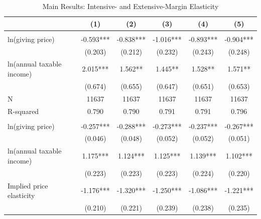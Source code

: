 \documentclass[
  11pt,
  a4paper,
]{article}
\begin{document}
  \begin{table}

  \caption{\label{tab:kableEstimateElasticityPart2}Main Results: Intensive- and Extensive-Margin Elasticity}
  \centering
  \fontsize{7}{9}\selectfont
  \begin{threeparttable}
  \begin{tabular}[t]{lccccc}
  \toprule
   & (1) & (2) & (3) & (4) & (5)\\
  \midrule
  \addlinespace[0.3em]
  \multicolumn{6}{l}{\textbf{Intensive-Margin Elasticity}}\\
  \hspace{1em}ln(giving price) & -0.593*** & -0.838*** & -1.016*** & -0.893*** & -0.904***\\
  \hspace{1em} & (0.203) & (0.212) & (0.232) & (0.243) & (0.248)\\
  \hspace{1em}ln(annual taxable income) & 2.015*** & 1.562** & 1.445** & 1.528** & 1.571**\\
  \hspace{1em} & (0.674) & (0.655) & (0.647) & (0.651) & (0.653)\\
  \hspace{1em}N & 11637 & 11637 & 11637 & 11637 & 11637\\
  \hspace{1em}R-squared & 0.790 & 0.790 & 0.791 & 0.791 & 0.796\\
  \addlinespace[0.3em]
  \multicolumn{6}{l}{\textbf{Extensive-Margin Elasticity}}\\
  \hspace{1em}ln(giving price) & -0.257*** & -0.288*** & -0.273*** & -0.237*** & -0.267***\\
  \hspace{1em} & (0.046) & (0.048) & (0.052) & (0.052) & (0.051)\\
  \hspace{1em}ln(annual taxable income) & 1.175*** & 1.124*** & 1.125*** & 1.139*** & 1.102***\\
  \hspace{1em} & (0.223) & (0.223) & (0.223) & (0.224) & (0.220)\\
  \hspace{1em}Implied price elasticity & -1.176*** & -1.320*** & -1.250*** & -1.086*** & -1.221***\\
  \hspace{1em} & (0.210) & (0.221) & (0.239) & (0.238) & (0.235)\\

\end{tabular}
\end{threeparttable}
\end{table}
\end{document}
